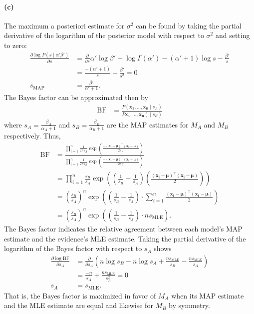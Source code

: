 \documentclass[a4paper,11pt]{article}
\DeclareMathOperator{\given}{\mid}
\begin{document}
\paragraph{(c)}
The maximum a posteriori estimate for $\sigma^2$ can be found by taking the partial derivative of the logarithm of the posterior model with respect to $\sigma^2$ and setting to zero:
\begin{align*}
\frac{\partial\log P(s\given\alpha'\beta')}{\partial s}
&=
  \frac{\partial}{\partial s}
    \alpha'\log\beta' - \log\Gamma(\alpha')
    -(\alpha'+1)\log s -\frac{\beta'}{s}\\
&=
  \frac{-(\alpha'+1)}{s} + \frac{\beta'}{s^2}=0
\\
s_\mathrm{\scriptscriptstyle{MAP}}&=\frac{\beta'}{\alpha'+1}.  
\end{align*}
The Bayes factor can be approximated then by
\begin{align*}
\mathrm{BF}&=
  \frac{
    P(\mathbf{x_1},\dots,\mathbf{x_n}\given s_A)
  }{
    P\mathbf{x_1},\dots,\mathbf{x_n}(\given s_B)
  }
\end{align*}
where $s_A=\frac{\beta_A}{\alpha_A+1}$ and $s_B=\frac{\beta_B}{\alpha_B+1}$ are the MAP estimates for $M_A$ and $M_B$ respectively. Thus,
\begin{align*}
\mathrm{BF}&=
  \frac{
    \prod_{i=1}^n
      \frac{1}{2\pi s_A}
      \exp\left(
        \frac{
          -(\mathbf{x_i}-\boldsymbol\mu)^\top(\mathbf{x_i}-\boldsymbol\mu)
        }{
          2s_A
        }
      \right)
  }{
    \prod_{i=1}^n
      \frac{1}{2\pi s_B}
      \exp\left(
        \frac{
          -(\mathbf{x_i}-\boldsymbol\mu)^\top(\mathbf{x_i}-\boldsymbol\mu)
        }{
          2s_B
        }
      \right)
  }
\\
&=
  \prod_{i=1}^n
    \frac{s_B}{s_A}
    \exp\left(
      (\frac{1}{s_B}-\frac{1}{s_A})
      (\frac{(\mathbf{x_i}-\boldsymbol\mu)^\top(\mathbf{x_i}-\boldsymbol\mu)}{2})
    \right)
\\
&=
  \left(\frac{s_B}{s_A}\right)^n
  \exp\left(
    (\frac{1}{s_B}-\frac{1}{s_A})
    \cdot\sum_{i=1}^n\frac{(\mathbf{x_i}-\boldsymbol\mu)^\top(\mathbf{x_i}-\boldsymbol\mu)}{2}
  \right)
\\
&=
  \left(\frac{s_B}{s_A}\right)^n
  \exp\left(
    (\frac{1}{s_B}-\frac{1}{s_A})
    \cdot ns_\mathrm{\scriptscriptstyle{MLE}}
  \right).
\end{align*}
The Bayes factor indicates the relative agreement between each model's MAP estimate and the evidence's MLE estimate. Taking the partial derivative of the logarithm of the Bayes factor with respect to $s_A$ shows
\begin{align*}
\frac{\partial\log\mathrm{BF}}{\partial s_A}&=
  \frac{\partial}{\partial s_A}
  \left(
    n\log s_B - n\log s_A + \frac{ns_\mathrm{\scriptscriptstyle{MLE}}}{s_B}-\frac{ns_\mathrm{\scriptscriptstyle{MLE}}}{s_A}
  \right)
\\
&=
  \frac{-n}{s_A}+\frac{ns_\mathrm{\scriptscriptstyle{MLE}}}{s_A^2}=0
\\
s_A&=s_\mathrm{\scriptscriptstyle{MLE}}.  
\end{align*}
That is, the Bayes factor is maximized in favor of $M_A$ when its MAP estimate and the MLE estimate are equal and likewise for $M_B$ by symmetry. 
\end{document}
